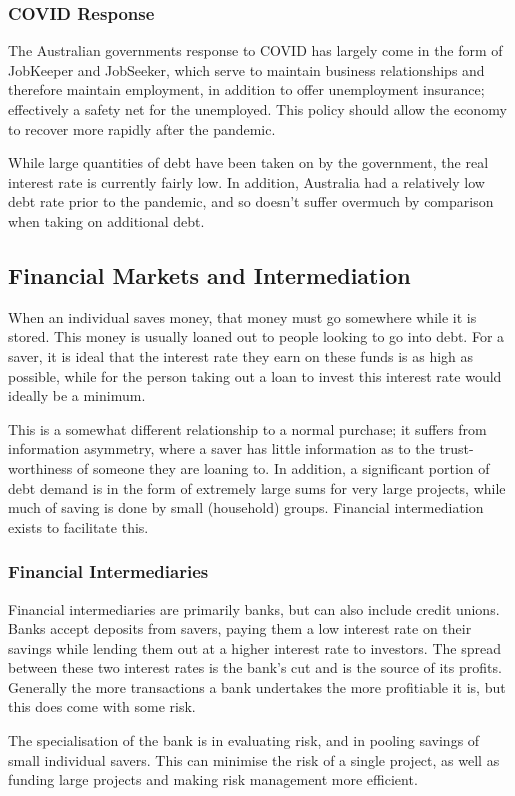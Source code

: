 \documentclass[12pt]{report}
\begin{document}
\begin{flushleft}
\subsubsection*{COVID Response}

The Australian governments response to COVID has largely come in the form of
JobKeeper and JobSeeker, which serve to maintain business relationships and
therefore maintain employment, in addition to offer unemployment insurance;
effectively a safety net for the unemployed. This policy should allow the 
economy to recover more rapidly after the pandemic. \par
While large quantities of debt have been taken on by the government, the 
real interest rate is currently fairly low. In addition, Australia had a
relatively low debt rate prior to the pandemic, and so doesn't suffer overmuch
by comparison when taking on additional debt.

\subsection*{Financial Markets and Intermediation}

When an individual saves money, that money must go somewhere while it is
stored. This money is usually loaned out to people looking to go into debt.
For a saver, it is ideal that the interest rate they earn on these funds is
as high as possible, while for the person taking out a loan to invest this
interest rate would ideally be a minimum. \par
This is a somewhat different relationship to a normal purchase; it suffers from
information asymmetry, where a saver has little information as to the trust-
worthiness of someone they are loaning to. In addition, a significant portion
of debt demand is in the form of extremely large sums for very large projects,
while much of saving is done by small (household) groups. Financial
intermediation exists to facilitate this.

\subsubsection*{Financial Intermediaries}

Financial intermediaries are primarily banks, but can also include credit
unions. Banks accept deposits from savers, paying them a low interest rate
on their savings while lending them out at a higher interest rate to investors.
The spread between these two interest rates is the bank's cut and is the source
of its profits. Generally the more transactions a bank undertakes the more
profitiable it is, but this does come with some risk. \par
The specialisation of the bank is in evaluating risk, and in pooling savings of
small individual savers. This can minimise the risk of a single project, as
well as funding large projects and making risk management more efficient.


\end{flushleft}
\end{document}
